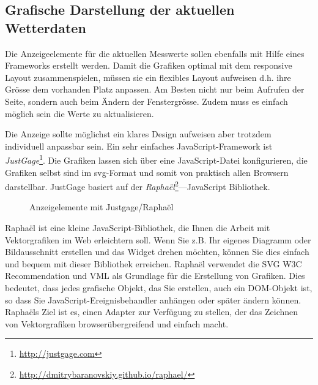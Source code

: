 \subsection{Grafische Darstellung der aktuellen Wetterdaten}
Die Anzeigeelemente für die aktuellen Messwerte sollen ebenfalls mit Hilfe eines Frameworks erstellt werden. Damit die Grafiken optimal mit dem responsive Layout zusammenspielen, müssen sie ein flexibles Layout aufweisen d.h. ihre Grösse dem vorhanden Platz anpassen. Am Besten nicht nur beim Aufrufen der Seite, sondern auch beim Ändern der Fenstergrösse. Zudem muss es einfach möglich sein die Werte zu aktualisieren.

Die Anzeige sollte möglichst ein klares Design aufweisen aber trotzdem individuell anpassbar sein. Ein sehr einfaches JavaScript-Framework ist \textit{JustGage}\footnote{ \url{http://justgage.com}}. Die Grafiken lassen sich über eine JavaScript-Datei konfigurieren, die Grafiken selbst sind im svg-Format und somit von praktisch allen Browsern darstellbar. JustGage basiert auf der \textit{Raphaël}\footnote{ \url{http://dmitrybaranovskiy.github.io/raphael/}}—JavaScript Bibliothek.

\begin{figure}[h!]
	\centering
	\caption{Anzeigelemente mit Justgage/Raphaël}
	\label{img:gauges}
\end{figure}

Raphaël ist eine kleine JavaScript-Bibliothek, die Ihnen die Arbeit mit Vektorgrafiken im Web erleichtern soll. Wenn Sie z.B. Ihr eigenes Diagramm oder Bildausschnitt erstellen und das Widget drehen möchten, können Sie dies einfach und bequem mit dieser Bibliothek erreichen. Raphaël verwendet die SVG W3C Recommendation und VML als Grundlage für die Erstellung von Grafiken. Dies bedeutet, dass jedes grafische Objekt, das Sie erstellen, auch ein DOM-Objekt ist, so dass Sie JavaScript-Ereignisbehandler anhängen oder später ändern können. Raphaëls Ziel ist es, einen Adapter zur Verfügung zu stellen, der das Zeichnen von Vektorgrafiken browserübergreifend und einfach macht.


